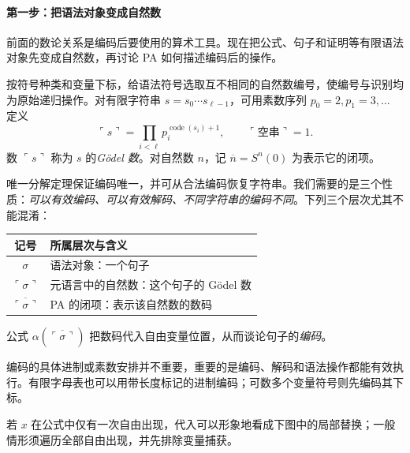 \documentclass[lang=cn,a4paper,fontset=none,zihao=false,10pt,openany,twoside]{beautybook}
\numberwithin{algorithm}{chapter}
\begin{document}
\paragraph{第一步：把语法对象变成自然数}
前面的数论关系是编码后要使用的算术工具。现在把公式、句子和证明等有限语法对象先变成自然数，再讨论 PA 如何描述编码后的操作。

\begin{definition}[Gödel 编码]
按符号种类和变量下标，给语法符号选取互不相同的自然数编号，使编号与识别均为原始递归操作。对有限字符串 $s=s_0\cdots s_{\ell-1}$，可用素数序列 $p_0=2,p_1=3,\ldots$ 定义
\[
 \ulcorner s\urcorner=\prod_{i<\ell}p_i^{\operatorname{code}(s_i)+1},
 \qquad\ulcorner\text{空串}\urcorner=1.
\]
数 $\ulcorner s\urcorner$ 称为 $s$ 的\emph{Gödel 数}。对自然数 $n$，记 $\overline n=S^n(0)$ 为表示它的闭项。
\end{definition}
唯一分解定理保证编码唯一，并可从合法编码恢复字符串。我们需要的是三个性质：\emph{可以有效编码、可以有效解码、不同字符串的编码不同}。下列三个层次尤其不能混淆：
\begin{center}
\begin{tabular}{cl}
\toprule
记号 & 所属层次与含义\\\midrule
$\sigma$ & 语法对象：一个句子\\
$\ulcorner\sigma\urcorner$ & 元语言中的自然数：这个句子的 Gödel 数\\
$\overline{\ulcorner\sigma\urcorner}$ & PA 的闭项：表示该自然数的数码\\
\bottomrule
\end{tabular}
\end{center}
公式 $\alpha(\overline{\ulcorner\sigma\urcorner})$ 把数码代入自由变量位置，从而谈论句子的\emph{编码}。

编码的具体进制或素数安排并不重要，重要的是编码、解码和语法操作都能有效执行。有限字母表也可以用带长度标记的进制编码；可数多个变量符号则先编码其下标。

若 $x$ 在公式中仅有一次自由出现，代入可以形象地看成下图中的局部替换；一般情形须遍历全部自由出现，并先排除变量捕获。
\begin{center}
\end{center}
\end{document}
